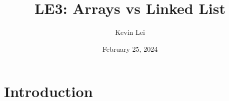 \documentclass{article}
\title{LE3: Arrays vs Linked List}
\author{Kevin Lei}
\date{February 25, 2024}
\begin{document}
\maketitle

\section{Introduction}
\end{document}
